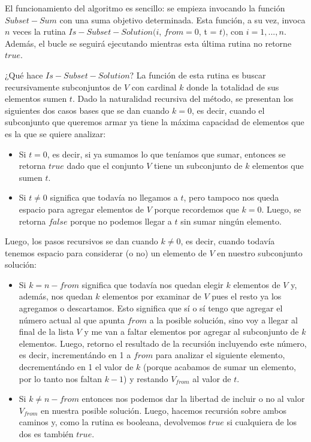 El funcionamiento del algoritmo es sencillo: se empieza invocando la función $Subset-Sum$ con una suma objetivo determinada. Esta función, a su vez, invoca $n$ veces la rutina $Is-Subset-Solution(i$, $from = 0$, t = $t)$, con $i = 1, ..., n$. Además, el bucle se seguirá ejecutando mientras esta última rutina no retorne $true$.

\vskip 8pt

¿Qué hace $Is-Subset-Solution$? La función de esta rutina es buscar recursivamente subconjuntos de $V$ con cardinal $k$ donde la totalidad de sus elementos sumen $t$. Dado la naturalidad recursiva del método, se presentan los siguientes dos casos bases que se dan cuando $k = 0$, es decir, cuando el subconjunto que queremos armar ya tiene la máxima capacidad de elementos que es la que se quiere analizar:
\begin{itemize}
	\item Si $t = 0$, es decir, si ya sumamos lo que teníamos que sumar, entonces se retorna $true$ dado que el conjunto $V$ tiene un subconjunto de $k$ elementos que sumen $t$.
	\item Si $t \neq 0$ significa que todavía no llegamos a $t$, pero tampoco nos queda espacio para agregar elementos de $V$ porque recordemos que $k = 0$. Luego, se retorna $false$ porque no podemos llegar a $t$ sin sumar ningún elemento.
\end{itemize}
Luego, los pasos recursivos se dan cuando $k \neq 0$, es decir, cuando todavía tenemos espacio para considerar (o no) un elemento de $V$ en nuestro subconjunto solución:
\begin{itemize}
	\item Si $k = n - from$ significa que todavía nos quedan elegir $k$ elementos de $V$ y, además, nos quedan $k$ elementos por examinar de $V$ pues el resto ya los agregamos o descartamos. Esto significa que sí o sí tengo que agregar el número actual al que apunta $from$ a la posible solución, sino voy a llegar al final de la lista $V$ y me van a faltar elementos por agregar al subconjunto de $k$ elementos. Luego, retorno el resultado de la recursión incluyendo este número, es decir, incrementándo en 1 a $from$ para analizar el siguiente elemento, decrementándo en 1 el valor de $k$ (porque acabamos de sumar un elemento, por lo tanto nos faltan $k - 1$) y restando $V_{from}$ al valor de $t$.
	\item  Si $k \neq n - from$ entonces nos podemos dar la libertad de incluir o no al valor $V_{from}$ en nuestra posible solución. Luego, hacemos recursión sobre ambos caminos y, como la rutina es booleana, devolvemos $true$ si cualquiera de los dos es también $true$.
\end{itemize}


